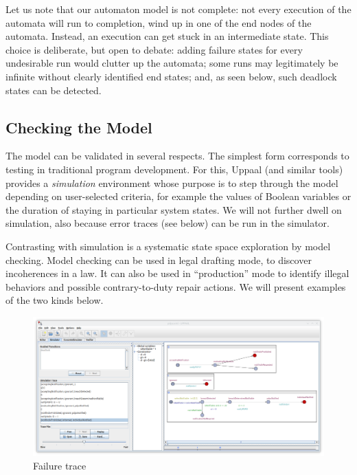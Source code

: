 Let us note that our automaton model is not complete: not every execution of
the automata will run to completion, \ie wind up in one of the end nodes of
the automata. Instead, an execution can get stuck in an intermediate
state. This choice is deliberate, but open to debate: adding failure states
for every undesirable run would clutter up the automata; some runs may
legitimately be infinite without clearly identified end states; and, as seen
below, such deadlock states can be detected.

\subsection{Checking the Model}\label{sec:checking_the_model}

The model can be validated in several respects. The simplest form corresponds
to testing in traditional program development. For this, Uppaal (and similar
tools) provides a \emph{simulation} environment whose purpose is to step
through the model depending on user-selected criteria, for example the values
of Boolean variables or the duration of staying in particular system
states. We will not further dwell on simulation, also because error traces
(see below) can be run in the simulator.

Contrasting with simulation is a systematic state space exploration by model
checking. Model checking can be used in legal drafting mode, to discover
incoherences in a law. It can also be used in ``production'' mode to identify
illegal behaviors and possible contrary-to-duty repair actions. We will
present examples of the two kinds below.

\begin{figure}[htp]
\centering
\includegraphics[width=\textwidth]{Figures/pdpa_trace.png}
\caption{Failure trace}\label{fig:pdpa_trace}
\end{figure}

